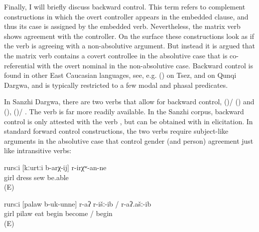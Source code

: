 Finally, I will briefly discuss backward control. This term refers to complement constructions in which the overt controller appears in the embedded clause, and thus its case is assigned by the embedded verb. Nevertheless, the matrix verb shows agreement with the controller. On the surface these constructions look as if the verb is agreeing with a non-absolutive argument. But instead it is argued that the matrix verb contains a covert controllee in the absolutive case that is co-referential with the overt nominal in the non-absolutive case. Backward control is found in other East Caucasian languages, see, e.g.  () on Tsez, and \citet{Serdobolskaya2010} on Qunqi Dargwa, and is typically restricted to a few modal and phasal predicates.

In Sanzhi Dargwa, there are two verbs that allow for backward control,  ()\slash{} ()  and  (),  ()\slash{} . The verb  is far more readily available. In the Sanzhi corpus, backward control is only attested with the verb , but can be obtained with  in elicitation. In standard forward control constructions, the two verbs require subject-like arguments in the absolutive case that control gender (and person) agreement just like intransitive verbs:
%
\begin{exe}
	\ex
	\gll	rursːi	[kːurtːi	b-arχ-ij]	r-irχʷ-an-ne\\
		girl	dress	sew	be.able\\
	\glt	{} (E)

	\ex
	\gll	rursːi	[palaw	b-uk-unne]	r-aʔ	r-išː-ib	/	r-aʔ.ašː-ib\\
		girl	pilaw	eat \tsc{f-}begin	become	/ begin\\
	\glt	{} (E)
\end{exe}

